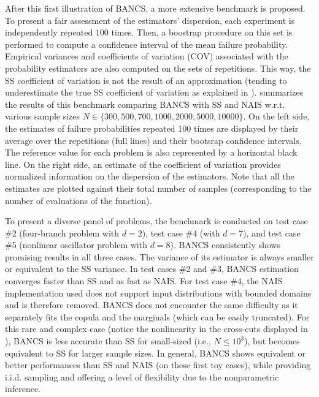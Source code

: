 After this first illustration of BANCS, a more extensive benchmark is proposed. 
To present a fair assessment of the estimators' dispersion, each experiment is independently repeated $100$ times. 
Then, a boostrap procedure on this set is performed to compute a confidence interval of the mean failure probability. 
Empirical variances and coefficients of variation (COV) associated with the probability estimators are also computed on the sets of repetitions. 
This way, the SS coefficient of variation is not the result of an approximation (tending to underestimate the true SS coefficient of variation as explained in \citealp{Papaioannou_PEM_2015}).
 summarizes the results of this benchmark comparing BANCS with SS and NAIS w.r.t. various sample sizes $N \in \{300, 500, 700, 1000, 2000, 5000, 10000\}$.  
On the left side, the estimates of failure probabilities repeated 100 times are displayed by their average over the repetitions (full lines) and their bootsrap confidence intervals. 
The reference value for each problem is also represented by a horizontal black line. 
On the right side, an estimate of the coefficient of variation provides normalized information on the dispersion of the estimators.  
Note that all the estimates are plotted against their total number of samples (corresponding to the number of evaluations of the function). 

To present a diverse panel of problems, the benchmark is conducted on test case \#2 (four-branch problem with $d=2$), test case \#4 (with $d=7$), and test case \#5 (nonlinear oscillator problem with $d=8$). 
BANCS consistently shows promising results in all three cases. 
The variance of its estimator is always smaller or equivalent to the SS variance. 
In test cases \#2 and \#3, BANCS estimation converges faster than SS and as fast as NAIS. 
For test case \#4, the NAIS implementation used does not support input distributions with bounded domains and is therefore removed. 
BANCS does not encounter the same difficulty as it separately fits the copula and the marginals (which can be easily truncated). 
For this rare and complex case (notice the nonlinearity in the cross-cuts displayed in ), BANCS is less accurate than SS for small-sized (i.e., $N\leq 10^3$), but becomes equivalent to SS for larger sample sizes.
In general, BANCS shows equivalent or better performances than SS and NAIS (on these first toy cases), while providing i.i.d. sampling and offering a level of flexibility due to the nonparametric inference. 

